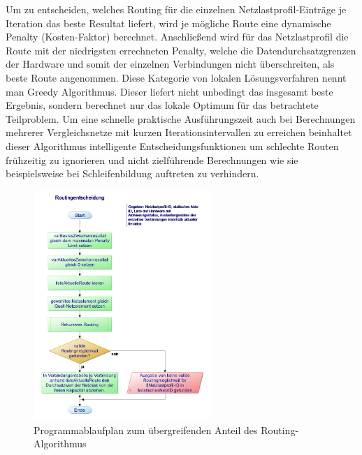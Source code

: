\documentclass[12pt,titlepage]{article}
\begin{document}
Um zu entscheiden, welches Routing für die einzelnen Netzlastprofil-Einträge je Iteration das beste Resultat liefert, wird je mögliche Route eine dynamische Penalty (Kosten-Faktor) berechnet. Anschließend wird für das Netzlastprofil die Route mit der niedrigsten errechneten Penalty, welche die Datendurchsatzgrenzen der Hardware und somit der einzelnen Verbindungen nicht überschreiten, als beste Route angenommen. Diese Kategorie von lokalen Lösungsverfahren nennt man Greedy Algorithmus. Dieser liefert nicht unbedingt das insgesamt beste Ergebnis, sondern berechnet nur das lokale Optimum für das betrachtete Teilproblem. Um eine schnelle praktische Ausführungszeit auch bei Berechnungen mehrerer Vergleichsnetze mit kurzen Iterationsintervallen zu erreichen beinhaltet dieser Algorithmus intelligente Entscheidungsfunktionen um schlechte Routen frühzeitig zu ignorieren und nicht zielführende Berechnungen wie sie beispielsweise bei Schleifenbildung auftreten zu verhindern.
\begin{figure}[!]
	\centering
	\includegraphics[width=0.6\textwidth]{2Routingentscheidung}
	\caption{Programmablaufplan zum übergreifenden Anteil des Routing-Algorithmus}
	\label{fig:2Routingentscheidung}
\end{figure}
\end{document}
